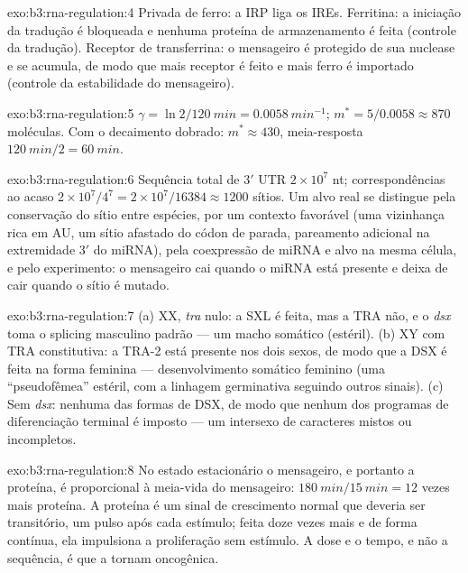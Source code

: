 \begin{solution}{exo:b3:rna-regulation:4}
Privada de ferro: a IRP liga os IREs. Ferritina: a iniciação da
tradução é bloqueada e nenhuma proteína de armazenamento é feita
(controle da tradução). Receptor de transferrina: o mensageiro é
protegido de sua nuclease e se acumula, de modo que mais receptor é
feito e mais ferro é importado (controle da estabilidade do
mensageiro).
\end{solution}

\begin{solution}{exo:b3:rna-regulation:5}
$\gamma = \ln 2/\qty{120}{min} = \qty{0.0058}{min^{-1}}$; $m^{*} =
5/0.0058 \approx 870$ moléculas. Com o decaimento dobrado:
$m^{*} \approx 430$, meia-resposta $\qty{120}{min}/2 = \qty{60}{min}$.
\end{solution}

\begin{solution}{exo:b3:rna-regulation:6}
Sequência total de 3$'$ UTR $2\times 10^{7}$ nt; correspondências ao
acaso $2\times
10^{7}/4^{7} = 2\times 10^{7}/\num{16384} \approx \num{1200}$ sítios. Um alvo real se
distingue pela conservação do sítio entre espécies, por um contexto
favorável (uma vizinhança rica em AU, um sítio afastado do códon de
parada, pareamento adicional na extremidade 3$'$ do miRNA), pela
coexpressão de miRNA e alvo na mesma célula, e pelo experimento: o
mensageiro cai quando o miRNA está presente e deixa de cair quando o
sítio é mutado.
\end{solution}

\begin{solution}{exo:b3:rna-regulation:7}
(a) XX, \emph{tra} nulo: a SXL é feita, mas a TRA não, e o \emph{dsx}
toma o splicing masculino padrão --- um macho somático (estéril). (b)
XY com TRA constitutiva: a TRA-2 está presente nos dois sexos, de modo
que a DSX é feita na forma feminina --- desenvolvimento somático
feminino (uma ``pseudofêmea'' estéril, com a linhagem germinativa
seguindo outros sinais). (c) Sem \emph{dsx}: nenhuma das formas de DSX,
de modo que nenhum dos programas de diferenciação terminal é imposto
--- um intersexo de caracteres mistos ou incompletos.
\end{solution}

\begin{solution}{exo:b3:rna-regulation:8}
No estado estacionário o mensageiro, e portanto a proteína, é
proporcional à meia-vida do mensageiro:
$\qty{180}{min}/\qty{15}{min} = 12$ vezes mais proteína. A proteína é
um sinal de crescimento normal que deveria ser transitório, um pulso
após cada estímulo; feita doze vezes mais e de forma contínua, ela
impulsiona a proliferação sem estímulo. A dose e o tempo, e não a
sequência, é que a tornam oncogênica.
\end{solution}

